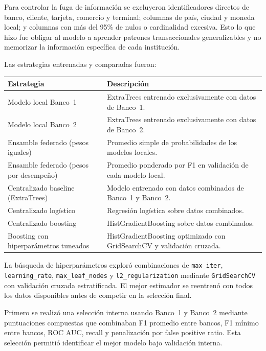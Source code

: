 \documentclass[10pt,a4paper]{article}
\begin{document}
Para controlar la fuga de información se excluyeron identificadores directos de banco, cliente,
tarjeta, comercio y terminal; columnas de país, ciudad y moneda local; y columnas con
más del 95\% de nulos o cardinalidad excesiva. Esto lo que hizo fue obligar al modelo a aprender patrones
transaccionales generalizables y no memorizar la información específica de cada institución.

Las estrategias entrenadas y comparadas fueron:

\begin{center}
\small
\begin{tabular}{p{} p{}}
\toprule
\textbf{Estrategia} & \textbf{Descripción} \\
\midrule
Modelo local Banco~1
  & ExtraTrees entrenado exclusivamente con datos de Banco~1. \\[3pt]
Modelo local Banco~2
  & ExtraTrees entrenado exclusivamente con datos de Banco~2. \\[3pt]
Ensamble federado (pesos iguales)
  & Promedio simple de probabilidades de los modelos locales. \\[3pt]
Ensamble federado (pesos por desempeño)
  & Promedio ponderado por F1 en validación de cada modelo local. \\[3pt]
Centralizado baseline (ExtraTrees)
  & Modelo entrenado con datos combinados de Banco~1 y Banco~2. \\[3pt]
Centralizado logístico
  & Regresión logística sobre datos combinados. \\[3pt]
Centralizado boosting
  & HistGradientBoosting sobre datos combinados. \\[3pt]
Boosting con hiperparámetros tuneados
  & HistGradientBoosting optimizado con GridSearchCV y validación cruzada. \\
\bottomrule
\end{tabular}
\end{center}

La búsqueda de hiperparámetros exploró combinaciones de \texttt{max\_iter},
\texttt{learning\_rate}, \texttt{max\_leaf\_nodes} y \texttt{l2\_regularization}
mediante \texttt{GridSearchCV} con validación cruzada estratificada.
El mejor estimador se reentrenó con todos los datos disponibles antes de competir
en la selección final.

Primero se realizó una selección interna usando Banco~1 y Banco~2 mediante puntuaciones
compuestas que combinaban F1 promedio entre bancos, F1 mínimo entre bancos, ROC AUC,
recall y penalización por false positive ratio. Esta selección permitió identificar
el mejor modelo bajo validación interna.
\end{document}
